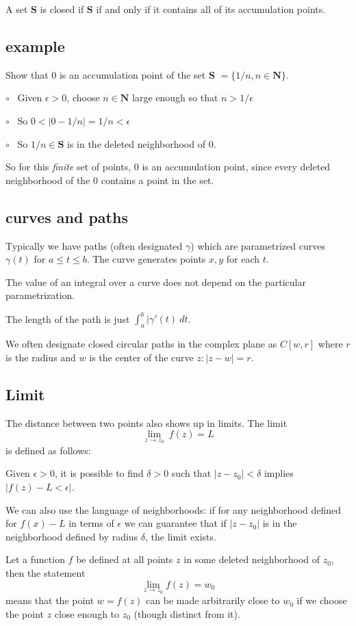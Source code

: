 \documentclass[11pt, oneside]{article}
\begin{document}
A set $\mathbf{S}$ is closed if $\mathbf{S}$ if and only if it contains all of its accumulation points.

\subsection*{example}
Show that $0$ is an accumulation point of the set $\mathbf{S}$ $= \{ 1/n, n \in \mathbf{N} \}$.

$\circ$ \ Given $\epsilon > 0$, choose $ n \in \mathbf{N}$ large enough so that $n > 1/\epsilon$

$\circ$ \ So $ 0 < |0 - 1/n| = 1/n < \epsilon$

$\circ$ \ So $1/n \in \mathbf{S}$ is in the deleted neighborhood of $0$.

So for this \emph{finite} set of points, $0$ is an accumulation point, since every deleted neighborhood of the $0$ contains a point in the set.

\subsection*{curves and paths}
Typically we have paths (often designated $\gamma$) which are parametrized curves $\gamma(t)$ for $a \le t \le b$.  The curve generates points $x,y$ for each $t$.

The value of an integral over a curve does not depend on the particular parametrization.

The length of the path is just $\int_a^b |\gamma'(t) \ dt$.

We often designate closed circular paths in the complex plane as $C[w,r]$ where  $r$ is the radius and $w$ is the center of the curve $z: |z - w| = r$.

\subsection*{Limit}
The distance between two points also shows up in limits.  The limit
\[ \lim_{z \rightarrow z_0} \ f(z) = L \]
is defined as follows:

Given $\epsilon > 0$, it is possible to find $\delta > 0$ such that $|z - z_0| < \delta$ implies $|f(z) - L < \epsilon|$.

We can also use the language of neighborhoods:  if for any neighborhood defined for $f(x) - L$ in terms of $\epsilon$ we can guarantee that if $|z-z_0|$ is in the neighborhood defined by radius $\delta$, the limit exists.

Let a function $f$ be defined at all points $z$ in some deleted neighborhood of $z_0$, then the statement
\[ \lim_{z \rightarrow z_0} f(z) = w_0 \]
means that the point $w = f(z)$ can be made arbitrarily close to $w_0$ if we choose the point $z$ close enough to $z_0$ (though distinct from it).
  
\end{document}
